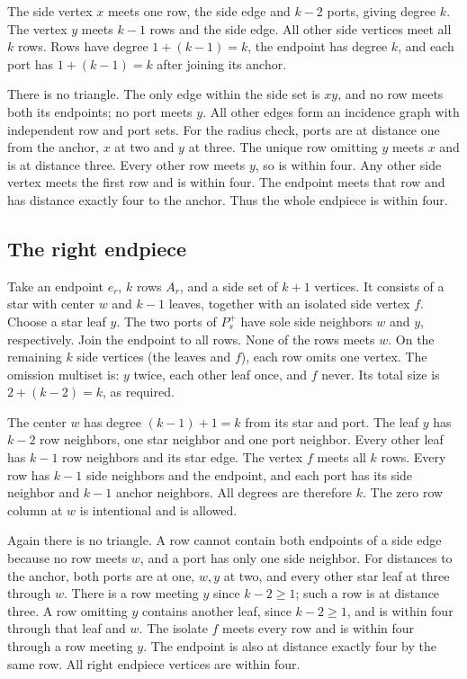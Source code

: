 \documentclass[11pt]{article}
\begin{document}
The side vertex $x$ meets one row, the side edge and $k-2$ ports,
giving degree $k$. The vertex $y$ meets $k-1$ rows and the side edge.
All other side vertices meet all $k$ rows. Rows have degree
$1+(k-1)=k$, the endpoint has degree $k$, and each port has
$1+(k-1)=k$ after joining its anchor.

There is no triangle. The only edge within the side set is $xy$,
and no row meets both its endpoints; no port meets $y$. All other
edges form an incidence graph with independent row and port sets.
For the radius check, ports are at distance one from the anchor,
$x$ at two and $y$ at three. The unique row omitting $y$ meets $x$
and is at distance three. Every other row meets $y$, so is within
four. Any other side vertex meets the first row and is within four.
The endpoint meets that row and has distance exactly four to the
anchor. Thus the whole endpiece is within four.

\subsection*{The right endpiece}
Take an endpoint $e_r$, $k$ rows $A_r$, and a side set of $k+1$
vertices. It consists of a star with center $w$ and $k-1$ leaves,
together with an isolated side vertex $f$. Choose a star leaf $y$.
The two ports of $P_s^+$ have sole side neighbors $w$ and $y$,
respectively. Join the endpoint to all rows. None of the rows meets
$w$. On the remaining $k$ side vertices (the leaves and $f$), each
row omits one vertex. The omission multiset is: $y$ twice, each other
leaf once, and $f$ never. Its total size is $2+(k-2)=k$, as required.

The center $w$ has degree $(k-1)+1=k$ from its star and port.
The leaf $y$ has $k-2$ row neighbors, one star neighbor and one
port neighbor. Every other leaf has $k-1$ row neighbors and its
star edge. The vertex $f$ meets all $k$ rows. Every row has
$k-1$ side neighbors and the endpoint, and each port has its side
neighbor and $k-1$ anchor neighbors. All degrees are therefore $k$.
The zero row column at $w$ is intentional and is allowed.

Again there is no triangle. A row cannot contain both endpoints
of a side edge because no row meets $w$, and a port has only one
side neighbor. For distances to the anchor, both ports are at one,
$w,y$ at two, and every other star leaf at three through $w$.
There is a row meeting $y$ since $k-2\geq1$; such a row is at
distance three. A row omitting $y$ contains another leaf, since
$k-2\geq1$, and is within four through that leaf and $w$.
The isolate $f$ meets every row and is within four through a row
meeting $y$. The endpoint is also at distance exactly four by
the same row. All right endpiece vertices are within four.
\end{document}
